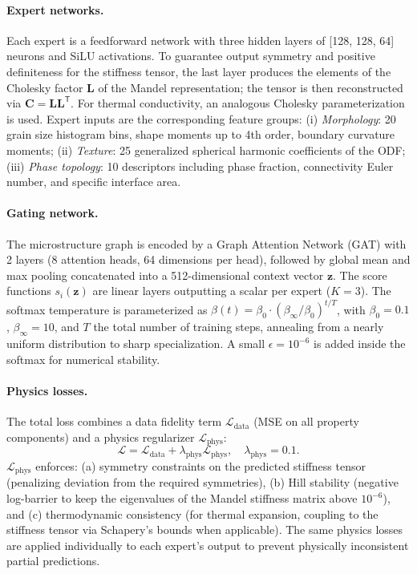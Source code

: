 \documentclass{article}
\begin{document}
\paragraph{Expert networks.}
Each expert is a feedforward network with three hidden layers of [128, 128, 64] neurons and SiLU activations. To guarantee output symmetry and positive definiteness for the stiffness tensor, the last layer produces the elements of the Cholesky factor $\mathbf{L}$ of the Mandel representation; the tensor is then reconstructed via $\mathbf{C} = \mathbf{L}\mathbf{L}^\mathsf{T}$. For thermal conductivity, an analogous Cholesky parameterization is used. Expert inputs are the corresponding feature groups: (i) \emph{Morphology}: 20 grain size histogram bins, shape moments up to 4th order, boundary curvature moments; (ii) \emph{Texture}: 25 generalized spherical harmonic coefficients of the ODF; (iii) \emph{Phase topology}: 10 descriptors including phase fraction, connectivity Euler number, and specific interface area.

\paragraph{Gating network.}
The microstructure graph is encoded by a Graph Attention Network (GAT) with 2 layers (8 attention heads, 64 dimensions per head), followed by global mean and max pooling concatenated into a 512-dimensional context vector $\mathbf{z}$. The score functions $s_i(\mathbf{z})$ are linear layers outputting a scalar per expert ($K=3$). The softmax temperature is parameterized as $\beta(t) = \beta_0 \cdot (\beta_\infty/\beta_0)^{t/T}$, with $\beta_0=0.1$, $\beta_\infty=10$, and $T$ the total number of training steps, annealing from a nearly uniform distribution to sharp specialization. A small $\epsilon=10^{-6}$ is added inside the softmax for numerical stability.

\paragraph{Physics losses.}
The total loss combines a data fidelity term $\mathcal{L}_{\text{data}}$ (MSE on all property components) and a physics regularizer $\mathcal{L}_{\text{phys}}$:
\begin{equation}
\mathcal{L} = \mathcal{L}_{\text{data}} + \lambda_{\text{phys}} \mathcal{L}_{\text{phys}}, \quad \lambda_{\text{phys}}=0.1.
\end{equation}
$\mathcal{L}_{\text{phys}}$ enforces: (a) symmetry constraints on the predicted stiffness tensor (penalizing deviation from the required symmetries), (b) Hill stability (negative log-barrier to keep the eigenvalues of the Mandel stiffness matrix above $10^{-6}$), and (c) thermodynamic consistency (for thermal expansion, coupling to the stiffness tensor via Schapery's bounds when applicable). The same physics losses are applied individually to each expert's output to prevent physically inconsistent partial predictions.
\end{document}
